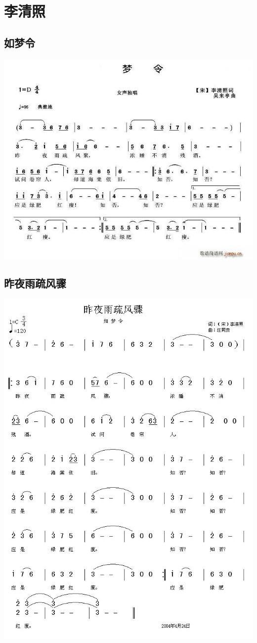 \documentclass[cn,pad,chinesefont=nofont,twocol]{elegantbook}
\begin{document}
\chapter{李清照}
\section{如梦令}
    \includegraphics[width=\textwidth]{dongxiao/20200808-如梦令-李清照.jpg}
\section{昨夜雨疏风骤}
    \includegraphics[width=\textwidth]{dongxiao/20200808-昨夜雨疏风骤-李清照.jpg}    
   
\end{document}
